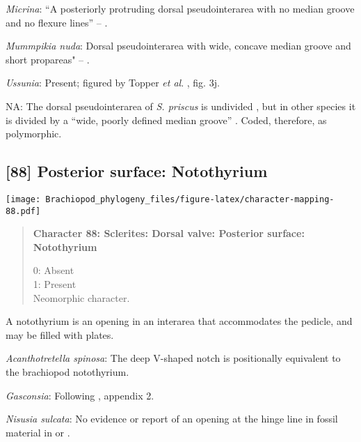 \documentclass[openany]{book}
\theoremstyle{definition}
\theoremstyle{definition}
\theoremstyle{definition}
\theoremstyle{remark}
\begin{document}
\hypertarget{Micrina-coding-87}{}
\emph{Micrina}: ``A posteriorly protruding dorsal pseudointerarea with
no median groove and no flexure lines'' --
\citet{Chen2007Reinterpretationof}.

\hypertarget{Mummpikia_nuda-coding-87}{}
\emph{Mummpikia nuda}: Dorsal pseudointerarea with wide, concave median
groove and short propareas" --
\citet{Williams2000LinguliformeaCraniiformea}.

\hypertarget{Ussunia-coding-87}{}
\emph{Ussunia}: Present; figured by Topper \emph{et al}.
\citeyearpar{Topper2013Reappraisalof}, fig. 3j.

\hypertarget{NA-coding-87}{}
NA: The dorsal pseudointerarea of \emph{S. priscus} is undivided
\citep{Popov2009Earlyontogeny}, but in other species it is divided by a
``wide, poorly defined median groove''
\citep{Williams2000LinguliformeaCraniiformea}. Coded, therefore, as
polymorphic.

\subsection*{{[}88{]} Posterior surface:
Notothyrium}\label{posterior-surface-notothyrium}

\texttt{[image: Brachiopod\_phylogeny\_files/figure-latex/character-mapping-88.pdf]}

\begin{quote}
\textbf{Character 88: Sclerites: Dorsal valve: Posterior surface:
Notothyrium}

0: Absent\\
1: Present\\
Neomorphic character.
\end{quote}

A notothyrium is an opening in an interarea that accommodates the
pedicle, and may be filled with plates.

\hypertarget{Acanthotretella_spinosa-coding-88}{}
\emph{Acanthotretella spinosa}: The deep V-shaped notch \citep[fig.
8]{Schwabe2010} is positionally equivalent to the brachiopod
notothyrium.

\hypertarget{Gasconsia-coding-88}{}
\emph{Gasconsia}: Following \citet{Williams1998Thediversity}, appendix
2.

\hypertarget{Nisusia_sulcata-coding-88}{}
\emph{Nisusia sulcata}: No evidence or report of an opening at the hinge
line in fossil material in \citet{Zhang2007Agregarious} or
\citet{Zhang2011Theexceptionally}.
\end{document}
